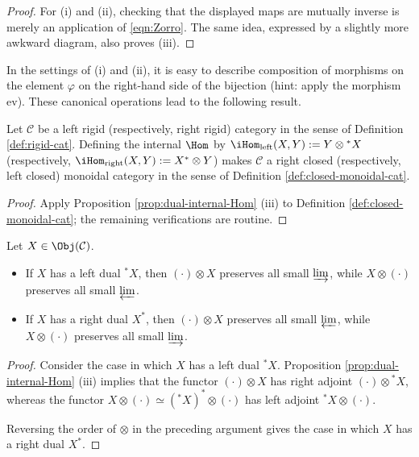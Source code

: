 \begin{proof}
	For (i) and (ii), checking that the displayed maps are mutually inverse is merely an application of \eqref{eqn:Zorro}. The same idea, expressed by a slightly more awkward diagram, also proves (iii).
\end{proof}

In the settings of (i) and (ii), it is easy to describe composition of morphisms on the element $\varphi$ on the right-hand side of the bijection (hint: apply the morphism $\mathrm{ev}$). These canonical operations lead to the following result.

\begin{corollary}\label{prop:rigid-Hom-internal}
	Let $\mathcal{C}$ be a left rigid (respectively, right rigid) category in the sense of Definition \ref{def:rigid-cat}. Defining the internal $\Hom$ by $\iHom_{\text{left}}(X, Y) := Y \otimes {}^* X$ (respectively, $\iHom_{\text{right}}(X, Y) := X^* \otimes Y$) makes $\mathcal{C}$ a right closed (respectively, left closed) monoidal category in the sense of Definition \ref{def:closed-monoidal-cat}.
\end{corollary}
\begin{proof}
	Apply Proposition \ref{prop:dual-internal-Hom} (iii) to Definition \ref{def:closed-monoidal-cat}; the remaining verifications are routine.
\end{proof}

\begin{corollary}\label{prop:rigid-exact}
	Let $X \in \Obj(\mathcal{C})$.
	\begin{itemize}
		\item If $X$ has a left dual ${}^* X$, then $(\cdot) \otimes X$ preserves all small $\varinjlim$, while $X \otimes (\cdot)$ preserves all small $\varprojlim$.
		\item If $X$ has a right dual $X^*$, then $(\cdot) \otimes X$ preserves all small $\varprojlim$, while $X \otimes (\cdot)$ preserves all small $\varinjlim$.
	\end{itemize}
\end{corollary}
\begin{proof}
	Consider the case in which $X$ has a left dual ${}^* X$. Proposition \ref{prop:dual-internal-Hom} (iii) implies that the functor $(\cdot) \otimes X$ has right adjoint $(\cdot) \otimes {}^* X$, whereas the functor $X \otimes (\cdot) \simeq ({}^* X)^* \otimes (\cdot)$ has left adjoint ${}^* X \otimes (\cdot)$.
	
	Reversing the order of $\otimes$ in the preceding argument gives the case in which $X$ has a right dual $X^*$.
\end{proof}
